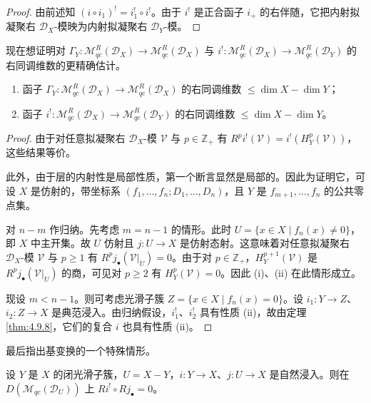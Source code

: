 \begin{proof}
由前述知 $(i\circ i_1)^!=i_1^!\circ i^!$。由于 $i^!$ 是正合函子 $i_+$ 的右伴随，它把内射拟凝聚右
$\mathcal{D}_X$-模映为内射拟凝聚右 $\mathcal{D}_Y$-模。
\end{proof}

现在想证明对 $\Gamma_Y:\mathcal{M}^R_{qc}(\mathcal{D}_X)\to\mathcal{M}^R_{qc}(\mathcal{D}_X)$ 与
$i^!:\mathcal{M}^R_{qc}(\mathcal{D}_X)\to\mathcal{M}^R_{qc}(\mathcal{D}_Y)$ 的右同调维数的更精确估计。

\begin{theorem}\label{thm:4.9.9}
\begin{enumerate}[label=(\roman*)]
  \item 函子 $\Gamma_Y:\mathcal{M}^R_{qc}(\mathcal{D}_X)\to\mathcal{M}^R_{qc}(\mathcal{D}_X)$ 的右同调维数 $\le\dim X-\dim Y$；
  \item 函子 $i^!:\mathcal{M}^R_{qc}(\mathcal{D}_X)\to\mathcal{M}^R_{qc}(\mathcal{D}_Y)$ 的右同调维数 $\le\dim X-\dim Y$。
\end{enumerate}
\end{theorem}

\begin{proof}
由于对任意拟凝聚右 $\mathcal{D}_X$-模 $\mathcal{V}$ 与 $p\in\mathbb{Z}_+$ 有
$R^pi^!(\mathcal{V})=i^!(H_Y^p(\mathcal{V}))$，这些结果等价。

此外，由于层的内射性是局部性质，第一个断言显然是局部的。因此为证明它，可设 $X$ 是仿射的，带坐标系 $(f_1,\dots,f_n;D_1,\dots,D_n)$，且 $Y$ 是 $f_{m+1},\dots,f_n$ 的公共零点集。

对 $n-m$ 作归纳。先考虑 $m=n-1$ 的情形。此时
$U=\{x\in X\mid f_n(x)\ne0\}$，即 $X$ 中主开集。故 $U$ 仿射且 $j:U\to X$ 是仿射态射。这意味着对任意拟凝聚右 $\mathcal{D}_X$-模 $\mathcal{V}$ 与 $p\ge1$ 有
$R^pj_\bullet(\mathcal{V}|_U)=0$。由于对 $p\in\mathbb{Z}_+$，$H^{p+1}_Y(\mathcal{V})$ 是
$R^pj_\bullet(\mathcal{V}|_U)$ 的商，可见对 $p\ge2$ 有 $H_Y^p(\mathcal{V})=0$。因此 (i)、(ii) 在此情形成立。

现设 $m<n-1$。则可考虑光滑子簇 $Z=\{x\in X\mid f_n(x)=0\}$。设 $i_1:Y\to Z$、$i_2:Z\to X$ 是典范浸入。由归纳假设，$i_1^!$、$i_2^!$ 具有性质 (ii)，故由定理 \ref{thm:4.9.8}，它们的复合 $i$ 也具有性质 (ii)。
\end{proof}

最后指出基变换的一个特殊情形。

\begin{lemma}\label{lem:4.9.10}
设 $Y$ 是 $X$ 的闭光滑子簇，$U=X-Y$，$i:Y\to X$、$j:U\to X$ 是自然浸入。则在
$D(\mathcal{M}_{qc}(\mathcal{D}_U))$ 上 $Ri^!\circ Rj_\bullet=0$。
\end{lemma}

